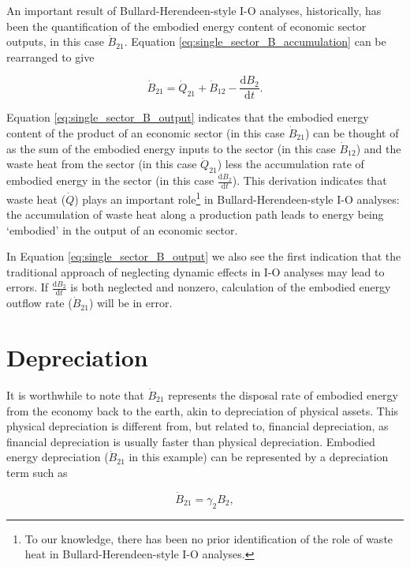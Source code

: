 An important result of Bullard-Herendeen-style I-O analyses, historically, has been the quantification of the embodied energy content of economic sector outputs, in this case $\dot{B}_{21}$. Equation \ref{eq:single_sector_B_accumulation} can be rearranged to give

\begin{equation} \label{eq:single_sector_B_output}
	\dot{B}_{21} = \dot{Q}_{21} + \dot{B}_{12} - \frac{\mathrm{d}B_{2}}{\mathrm{d}t}.
\end{equation}

Equation \ref{eq:single_sector_B_output} indicates that the embodied energy content of the product of an economic sector (in this case $\dot{B}_{21}$) can be thought of as the sum of the embodied energy inputs to the sector (in this case $\dot{B}_{12}$) and the waste heat from the sector (in this case $\dot{Q}_{21}$) less the accumulation rate of embodied energy in the sector (in this case $\frac{\mathrm{d}B_{2}}{\mathrm{d}t}$). This derivation indicates that waste heat ($\dot{Q}$) plays an important role\footnote{To our knowledge, there has been no prior identification of the role of waste heat in Bullard-Herendeen-style I-O analyses.} in Bullard-Herendeen-style I-O analyses: the accumulation of waste heat along a production path leads to energy being `embodied' in the output of an economic sector. 

In Equation \ref{eq:single_sector_B_output} we also see the first indication that the traditional approach of neglecting dynamic effects in I-O analyses may lead to errors. If $\frac{\mathrm{d}B_2}{\mathrm{d}t}$ is both neglected and nonzero, calculation of the embodied energy outflow rate ($\dot{B}_{21}$) will be in error.

\section{Depreciation}

It is worthwhile to note that $\dot{B}_{21}$ represents the disposal rate of embodied energy from the economy back to the earth, akin to depreciation of physical assets. This physical depreciation is different from, but related to, financial depreciation, as financial depreciation is usually faster than physical depreciation. Embodied energy depreciation ($\dot{B}_{21}$ in this example) can be represented by a depreciation term such as

\begin{equation} \label{eq:depreciation_term_defined}
	\dot{B}_{21} = \gamma_{2}B_{2},
\end{equation}


